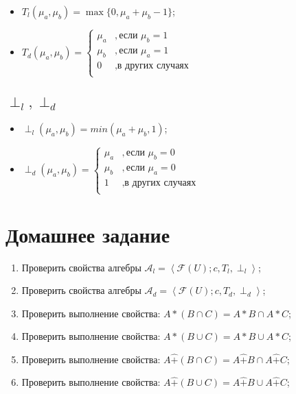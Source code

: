 \documentclass[12pt]{article}
\begin{document}
\begin{itemize}
    \item $T_l(\mu_a, \mu_b) = \max\{0, \mu_a+\mu_b-1\}$;
    \item $T_d(\mu_a, \mu_b) =
\begin{cases}
\mu_a &, \text{если }\mu_b=1\\
\mu_b &, \text{если }\mu_a=1\\
0 &,  \text{в других случаях}\\
\end{cases}$
\end{itemize}

\subsection{$\perp_l, \perp_d$}

\begin{itemize}
    \item $\perp_l(\mu_a, \mu_b) = min( \mu_a+\mu_b, 1)$;
    \item $\perp_d(\mu_a, \mu_b) =
\begin{cases}
\mu_a &, \text{если }\mu_b=0\\
\mu_b &, \text{если }\mu_a=0\\
1 &,  \text{в других случаях}\\
\end{cases}$  
\end{itemize}

\section{Домашнее задание}

\begin{enumerate}
    \item Проверить свойства алгебры $\mathcal{A}_l=\left<\mathcal{F}(U); c, T_l, \perp_l\right>$; 
    \item Проверить свойства алгебры $\mathcal{A}_d=\left<\mathcal{F}(U); c, T_d, \perp_d\right>$; 
    \item Проверить выполнение свойства: $A*\left(B\cap C\right) = A*B\cap A*C$;
    \item Проверить выполнение свойства: $A*\left(B\cup C\right) = A*B\cup A*C$;
    \item Проверить выполнение свойства: $A \hat{+}\left(B\cap C\right) = A\hat{+}B\cap A\hat{+}C$;
    \item Проверить выполнение свойства: $A \hat{+}\left(B\cup C\right) = A\hat{+}B\cup A\hat{+}C$;
\end{enumerate}
\end{document}
